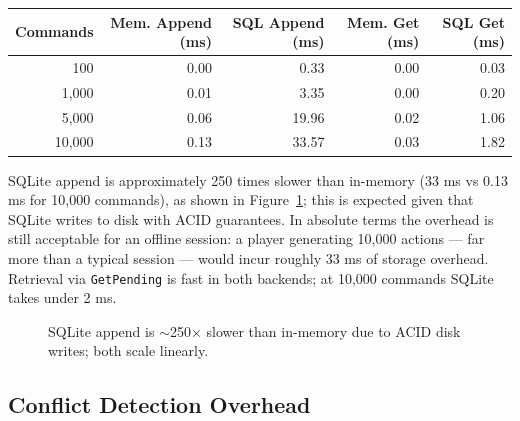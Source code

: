 \documentclass{article}
\begin{document}
\begin{center}
\begin{tabular}{rrrrr}
\hline
Commands & Mem. Append (ms) & SQL Append (ms) & Mem. Get (ms) & SQL Get (ms) \\
\hline
100      & 0.00             & 0.33            & 0.00          & 0.03         \\
1,000    & 0.01             & 3.35            & 0.00          & 0.20         \\
5,000    & 0.06             & 19.96           & 0.02          & 1.06         \\
10,000   & 0.13             & 33.57           & 0.03          & 1.82         \\
\hline
\end{tabular}
\end{center}

SQLite append is approximately 250 times slower than in-memory (33 ms vs 0.13 ms for 10,000 commands), as shown in Figure~\ref{fig:backends}; this is expected given that SQLite writes to disk with ACID guarantees. In absolute terms the overhead is still acceptable for an offline session: a player generating 10,000 actions — far more than a typical session — would incur roughly 33 ms of storage overhead. Retrieval via \texttt{GetPending} is fast in both backends; at 10,000 commands SQLite takes under 2 ms.

\begin{figure}[h]
\centering
{}
\caption{SQLite append is $\sim$250$\times$ slower than in-memory due to ACID disk writes; both scale linearly.}
\label{fig:backends}
\end{figure}

\subsection{Conflict Detection Overhead}
\end{document}
